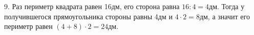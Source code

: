9. Раз периметр квадрата равен 16дм, его сторона равна $16:4=4$дм. Тогда у получившегося прямоугольника стороны равны 4дм и $4\cdot2=8$дм, а значит его периметр
равен $(4+8)\cdot2=24$дм.\\
